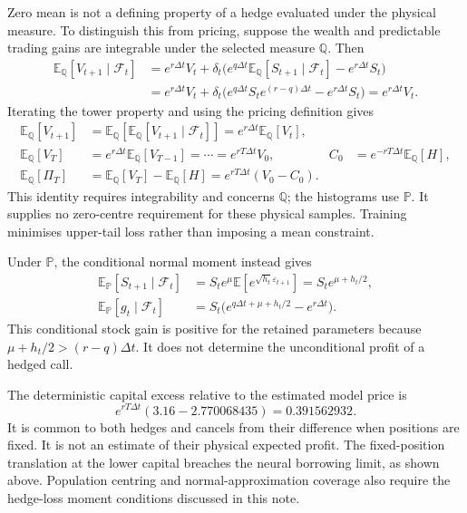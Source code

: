 \documentclass[11pt,a4paper]{article}
\theoremstyle{remark}
\begin{document}
Zero mean is not a defining property of a hedge evaluated under the physical measure. To distinguish this from pricing, suppose the wealth and predictable trading gains are integrable under the selected measure $\mathbb Q$. Then
\begin{align*}
 \mathbb E_{\mathbb Q}[V_{t+1}\mid\mathcal F_t]
 &=e^{r\Delta t}V_t+\delta_t\bigl(e^{q\Delta t}
     \mathbb E_{\mathbb Q}[S_{t+1}\mid\mathcal F_t]
                 -e^{r\Delta t}S_t\bigr)\\
 &=e^{r\Delta t}V_t+\delta_t\bigl(e^{q\Delta t}
       S_te^{(r-q)\Delta t}-e^{r\Delta t}S_t\bigr)
 =e^{r\Delta t}V_t.
\end{align*}
Iterating the tower property and using the pricing definition gives
\begin{align*}
 \mathbb E_{\mathbb Q}[V_{t+1}]
 &=\mathbb E_{\mathbb Q}\!\left[\mathbb E_{\mathbb Q}[V_{t+1}\mid\mathcal F_t]\right]
 =e^{r\Delta t}\mathbb E_{\mathbb Q}[V_t],\\
 \mathbb E_{\mathbb Q}[V_T]&=e^{r\Delta t}\mathbb E_{\mathbb Q}[V_{T-1}]
 =\cdots=e^{rT\Delta t}V_0,
 &C_0&=e^{-rT\Delta t}\mathbb E_{\mathbb Q}[H],\\
 \mathbb E_{\mathbb Q}[\Pi_T]
 &=\mathbb E_{\mathbb Q}[V_T]-\mathbb E_{\mathbb Q}[H]
 =e^{rT\Delta t}(V_0-C_0).
\end{align*}
This identity requires integrability and concerns $\mathbb Q$; the histograms use $\mathbb P$. It supplies no zero-centre requirement for these physical samples. Training minimises upper-tail loss rather than imposing a mean constraint.

Under $\mathbb P$, the conditional normal moment instead gives
\begin{align*}
 \mathbb E_{\mathbb P}[S_{t+1}\mid\mathcal F_t]
 &=S_te^\mu\mathbb E[e^{\sqrt{h_t}\varepsilon_{t+1}}]
 =S_te^{\mu+h_t/2},\\
 \mathbb E_{\mathbb P}[g_t\mid\mathcal F_t]
 &=S_t\bigl(e^{q\Delta t+\mu+h_t/2}-e^{r\Delta t}\bigr).
\end{align*}
This conditional stock gain is positive for the retained parameters because $\mu+h_t/2>(r-q)\Delta t$. It does not determine the unconditional profit of a hedged call.

The deterministic capital excess relative to the estimated model price is
\[
 e^{rT\Delta t}(3.16-2.770068435)=0.391562932.
\]
It is common to both hedges and cancels from their difference when positions are fixed. It is not an estimate of their physical expected profit. The fixed-position translation at the lower capital breaches the neural borrowing limit, as shown above. Population centring and normal-approximation coverage also require the hedge-loss moment conditions discussed in this note.
\end{document}
